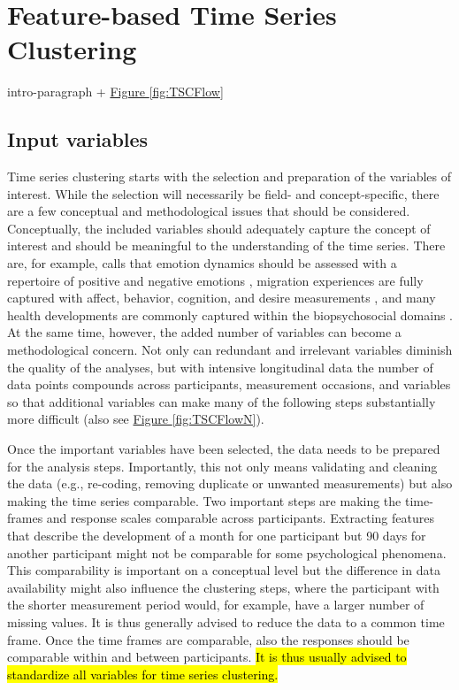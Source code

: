\documentclass[man, 12pt, a4paper]{apa7}
\theoremstyle{break}
\theoremstyle{plain}
\newcommand{\fgrref}[2][]{\hyperref[#2]{Figure \ref*{#2}#1}}
\begin{document}
\section{Feature-based Time Series Clustering}

intro-paragraph + \fgrref{fig:TSCFlow}

\subsection{Input variables}
Time series clustering starts with the selection and preparation of the variables of interest. While the selection will necessarily be field- and concept-specific, there are a few conceptual and methodological issues that should be considered. Conceptually, the included variables should adequately capture the concept of interest and should be meaningful to the understanding of the time series. There are, for example, calls that emotion dynamics should be assessed with a repertoire of positive and negative emotions \citep[e.g.,][]{dejonckheere2019}, migration experiences are fully captured with affect, behavior, cognition, and desire measurements \citep[e.g.,][]{Kreienkamp2022d}, and many health developments are commonly captured within the biopsychosocial domains \citep[e.g.,][]{suls2004}. At the same time, however, the added number of variables can become a methodological concern. Not only can redundant and irrelevant variables diminish the quality of the analyses, but with intensive longitudinal data the number of data points compounds across participants, measurement occasions, and variables so that additional variables can make many of the following steps substantially more difficult (also see \fgrref{fig:TSCFlowN}). 

Once the important variables have been selected, the data needs to be prepared for the analysis steps. Importantly, this not only means validating and cleaning the data (e.g., re-coding, removing duplicate or unwanted measurements) but also making the time series comparable. Two important steps are making the time-frames and response scales comparable across participants. Extracting features that describe the development of a month for one participant but 90 days for another participant might not be comparable for some psychological phenomena. This comparability is important on a conceptual level but the difference in data availability might also influence the clustering steps, where the participant with the shorter measurement period would, for example, have a larger number of missing values. It is thus generally advised to reduce the data to a common time frame. Once the time frames are comparable, also the responses should be comparable within and between participants. \hl{It is thus usually advised to standardize all variables for time series clustering.} 
\end{document}
